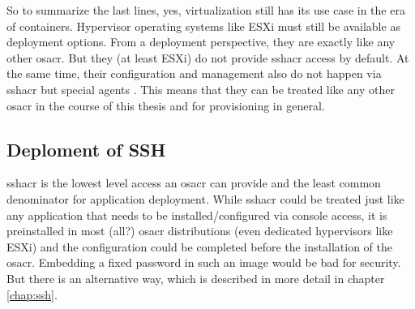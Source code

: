 \newline
So to summarize the last lines, yes, virtualization still has its use case in the era of containers. Hypervisor operating systems like ESXi must still be available as deployment options. From a deployment perspective, they are exactly like any other \gls{osacr}. But they (at least ESXi) do not provide \gls{sshacr} access by default. At the same time, their configuration and management also do not happen via \gls{sshacr} but special agents \cite{vsphere_essentials}. This means that they can be treated like any other \gls{osacr} in the course of this thesis and for provisioning in general.

\subsection{Deploment of SSH}
\Gls{sshacr} is the lowest level access an \gls{osacr} can provide and the least common denominator for application deployment.
\newline 
While \gls{sshacr} could be treated just like any application that needs to be installed/configured via console access, it is preinstalled in most (all?) \gls{osacr} distributions (even dedicated hypervisors like ESXi) and the configuration could be completed before the installation of the \gls{osacr}. Embedding a fixed password in such an image would be bad for security. But there is an alternative way, which is described in more detail in chapter \ref{chap:ssh}.



